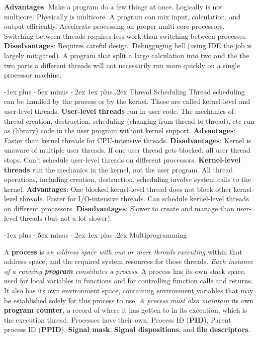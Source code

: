 \documentclass[10pt,landscape, a4paper]{article}
\makeatletter
\renewcommand{\subsubsection}{\@startsection{section}{1}{0mm}%
                                {-1ex plus -.5ex minus -.2ex}%
                                {0.5ex plus .2ex}%
                                {\normalfont\large\bfseries}}
\renewcommand{\subsubsection}{\@startsection{subsection}{2}{0mm}%
                                {-1explus -.5ex minus -.2ex}%
                                {0.5ex plus .2ex}%
                                {\normalfont\normalsize\bfseries}}
\renewcommand{\subsubsection}{\@startsection{subsubsection}{3}{0mm}%
                                {-1ex plus -.5ex minus -.2ex}%
                                {1ex plus .2ex}%
                                {\normalfont\small\bfseries}}
\makeatother
\begin{document}
\begin{multicols}{3}
\textbf{Advantages}:
Make a program do a few things at once.
Logically is not multicore.
Physically is multicore.
A program can mix input, calculation, and output efficiently.
Accelerate processing on proper multi-core processors.
Switching between threads requires less work than switching between processes.
\textbf{Disadvantages}:
Requires careful design.
Debugguging hell (using IDE the job is largely mitigated).
A program that split a large calculation into two and the 
the two parts a different threads will not necessarily 
run more quickly on a single processor machine.

\subsubsection{Thread Scheduling}
Thread scheduling can be handled by the process or by the kernel.  These are
called kernel-level and user-level threads.
\textbf{User-level threads} run in user code.  The mechanics of thread creation,
destruction, scheduling (changing from thread to thread), etc run as (library)
code in the user program without kernel support.
\textbf{Advantages}: Faster than kernel threads for CPU-intensive threads.
\textbf{Disadvantages}: Kernel is unaware of multiple user threads. 
If one user thread gets blocked, all user thread stops. 
Can't schedule user-level threads on different processors.
\textbf{Kernel-level threads} run the mechanics in the kernel, not the user program.
All thread operations, including creation, destruction, scheduling involve
system calls to the kernel.
\textbf{Advantages}: One blocked kernel-level thread does not block other kernel-level threads. 
Faster for I/O-intensive threads. Can schedule kernel-level threads on different processors.
\textbf{Disadvantages}: Slower to create and manage than user-level threads (but not a lot slower).

\subsubsection{Multiprogramming}

A \textbf{process} is a\emph{n address space
with one or more threads executing} within that address space, 
and the required system resources for those threads. \emph{Each instance of a running 
\textbf{program} constitutes a process}. A process has its own stack space, used for local 
variables in functions and for controlling function calls and returns. 
It also has its own environment space, containing environment variables 
that may be established solely for this process to use. \emph{A process must 
also maintain} its own \textbf{program counter}, a record of where it has gotten 
to in its execution, which is the execution thread. Processes have their
own: Process ID (\textbf{PID}), Parent process ID (\textbf{PPID}), \textbf{Signal mask},\textbf{ Signal dispositions}, 
and \textbf{file descriptors}.



\end{multicols}
\end{document}
